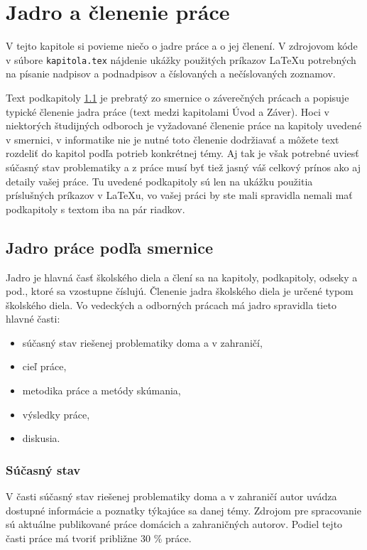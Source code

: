 \chapter{Jadro a členenie práce}

\label{kap:clenenie} %

V tejto kapitole si povieme niečo o jadre práce a o jej členení. V
zdrojovom kóde v súbore \verb'kapitola.tex' nájdenie ukážky použitých
príkazov LaTeXu potrebných na písanie nadpisov a podnadpisov a
číslovaných a nečíslovaných zoznamov.

Text podkapitoly \ref{sec:jadro} je
prebratý zo smernice o záverečných prácach \cite[článok 5]{smernica} a popisuje typické členenie jadra práce (text medzi kapitolami Úvod a Záver). Hoci v niektorých študijných odboroch je vyžadované členenie práce na kapitoly uvedené v smernici, v informatike nie je nutné toto členenie dodržiavať a môžete text rozdeliť do kapitol podľa potrieb konkrétnej témy. Aj tak je však potrebné uviesť súčasný stav problematiky a z práce musí byť tiež jasný váš celkový prínos ako aj detaily vašej práce. Tu uvedené podkapitoly sú len na ukážku použitia príslušných príkazov v LaTeXu, vo vašej práci by ste mali spravidla nemali mať podkapitoly s textom iba na pár riadkov. 

\section{Jadro práce podľa smernice}
\label{sec:jadro}
Jadro je hlavná časť školského diela a člení sa na kapitoly,
podkapitoly, odseky a pod., ktoré sa vzostupne číslujú.
Členenie jadra školského diela je určené typom  školského diela. Vo vedeckých 
a odborných prácach má jadro spravidla tieto hlavné časti:
\begin{itemize}
\item  súčasný stav riešenej problematiky doma a v zahraničí,
\item  cieľ práce,
\item  metodika práce a metódy skúmania,
\item  výsledky práce, 
\item  diskusia. 
\end{itemize}

\subsection{Súčasný stav}
V časti súčasný stav riešenej problematiky doma a v zahraničí autor uvádza 
dostupné informácie a poznatky týkajúce sa danej témy. Zdrojom pre spracovanie sú 
aktuálne publikované práce domácich a zahraničných autorov.  Podiel tejto časti práce 
má tvoriť približne 30 \% práce.

